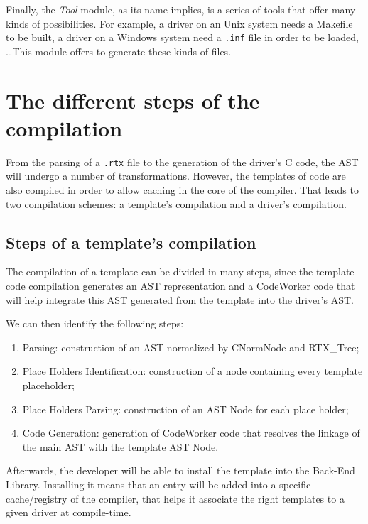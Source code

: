 \documentclass[american]{rtxreport}
\begin{document}
Finally, the \emph{Tool} module, as its name implies, is a series of tools that
offer many kinds of possibilities. For example, a driver on an Unix system
needs a Makefile to be built, a driver on a Windows system need a \texttt{.inf}
file in order to be loaded, \ldots This module offers to generate these kinds
of files.


\section{The different steps of the compilation}
\label{sec:compilationSteps}

From the parsing of a \texttt{.rtx} file to the generation of the driver's C
code, the AST will undergo a number of transformations. However, the templates
of code are also compiled in order to allow caching in the core of the
compiler.  That leads to two compilation schemes: a template's compilation and
a driver's compilation.

\subsection{Steps of a template's compilation}

The compilation of a template can be divided in many steps, since the template
code compilation generates an AST representation and a CodeWorker code that
will help integrate this AST generated from the template into the driver's AST.

We can then identify the following steps:
\begin{enumerate}
    \item Parsing: construction of an AST normalized by CNormNode and
        RTX\_Tree;
    \item Place Holders Identification: construction of a node containing
        every template placeholder;
    \item Place Holders Parsing: construction of an AST Node for each
        place holder;
    \item Code Generation: generation of CodeWorker code that resolves the
        linkage of the main AST with the template AST Node.
\end{enumerate}

Afterwards, the developer will be able to install the template into the
Back-End Library. Installing it means that an entry will be added into a
specific cache/registry of the compiler, that helps it associate the right
templates to a given driver at compile-time.
\end{document}
